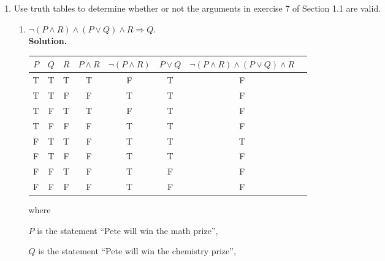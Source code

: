 \documentclass{report}
\newcommand{\sol}{\vspace{1em}\\\textbf{Solution.}\vspace{0.5em}}
\begin{document}
\begin{enumerate}[leftmargin=*]
    \item Use truth tables to determine whether or not the arguments in exercise 7 of
          Section 1.1 are valid.
          \begin{enumerate}
              \item $\neg(P \wedge R) \wedge (P \vee Q) \wedge
                        R \Rightarrow Q$.
                    \sol{}
                    \begin{center}
                        \begin{tabular}{cccccccc}
                            $P$ & $Q$ & $R$ & $P \wedge R$ & $\neg(P \wedge R)$ & $P \vee Q$ & $\neg(P \wedge R) \wedge (P \vee Q) \wedge R$ \\
                            \hline
                            T   & T   & T   & T            & F                  & T          & F                                             \\
                            T   & T   & F   & F            & T                  & T          & F                                             \\
                            T   & F   & T   & T            & F                  & T          & F                                             \\
                            T   & F   & F   & F            & T                  & T          & F                                             \\
                            F   & T   & T   & F            & T                  & T          & T                                             \\
                            F   & T   & F   & F            & T                  & T          & F                                             \\
                            F   & F   & T   & F            & T                  & F          & F                                             \\
                            F   & F   & F   & F            & T                  & F          & F
                        \end{tabular}
                    \end{center}
                    where

                    $P$ is the statement ``Pete will win the math prize'',

                    $Q$ is the statement ``Pete will win the chemistry prize'',


\end{enumerate}
\end{enumerate}
\end{document}
